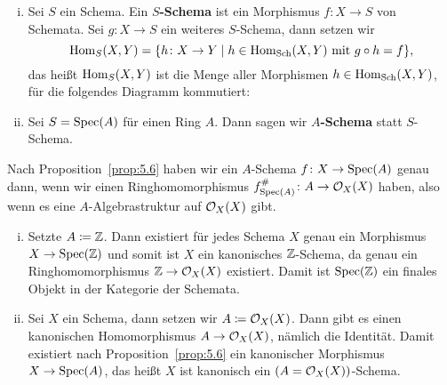 \begin{defn}
\label{defn:5.7}
	\begin{enumerate}[i)]
		\item Sei $S$ ein Schema. Ein $S$\textbf{-Schema} ist ein Morphismus $f\colon X \to S$ von Schemata. Sei $g\colon X \to S$ ein weiteres $S$-Schema, dann setzen wir
		\[
			\operatorname{Hom}_{S}(X,Y)=\{h\colon X\to Y\mid h \in \operatorname{Hom}_{\operatorname{Sch}}(X,Y) \text{ mit } g \circ h = f\},
		\]
		das heißt $\operatorname{Hom}_{S}(X,Y)$ ist die Menge aller Morphismen $h \in \operatorname{Hom}_{\operatorname{Sch}}(X,Y)$, für die folgendes Diagramm kommutiert:
		\begin{center}
		\end{center}
		\item Sei $S=\operatorname{Spec}(A)$ für einen Ring $A$. Dann sagen wir $A$\textbf{-Schema} statt $S$-Schema.
	\end{enumerate}
\end{defn}

\begin{bem*}
    Nach Proposition~\ref{prop:5.6} haben wir ein $A$-Schema $f \colon X \to \operatorname{Spec}(A)$ genau dann, wenn wir einen Ringhomomorphismus $f^{\#}_{\operatorname{Spec}(A)}\colon A \to \mathcal{O}_X(X)$ haben, also wenn es eine $A$-Alge\-brastruktur auf $\mathcal{O}_X(X)$ gibt.
\end{bem*}

\begin{bsp}
\label{bsp:5.8}
	\begin{enumerate}[i)]
		\item Setzte $A \coloneqq \mathbb {Z}$. Dann existiert für jedes Schema $X$ genau ein Morphismus $X \to \operatorname{Spec}(\mathbb {Z})$ und somit ist $X$ ein kanonisches $\mathbb {Z}$-Schema, da genau ein Ringhomomorphismus $\mathbb {Z} \to \mathcal{O}_X(X)$ existiert. Damit ist $\operatorname{Spec}(\mathbb {Z})$ ein finales Objekt in der Kategorie der Schemata.
		\item Sei $X$ ein Schema, dann setzen wir $A \coloneqq \mathcal{O}_X(X)$. Dann gibt es einen kanonischen Homomorphismus $A \to \mathcal{O}_X(X)$, nämlich die Identität. Damit existiert nach Proposition~\ref{prop:5.6} ein kanonischer Morphismus $X \to \operatorname{Spec}(A)$, das heißt $X$ ist kanonisch ein $(A=\mathcal{O}_X(X))$-Schema.
	\end{enumerate}
\end{bsp}

